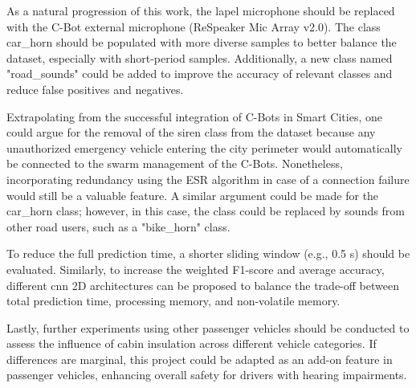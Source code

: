 As a natural progression of this work, the lapel microphone should be replaced with the C-Bot external microphone (ReSpeaker Mic Array v2.0). The class car\_horn should be populated with more diverse samples to better balance the dataset, especially with short-period samples. Additionally, a new class named "road\_sounds" could be added to improve the accuracy of relevant classes and reduce false positives and negatives. 

Extrapolating from the successful integration of C-Bots in Smart Cities, one could argue for the removal of the siren class from the dataset because any unauthorized emergency vehicle entering the city perimeter would automatically be connected to the swarm management of the C-Bots. Nonetheless, incorporating redundancy using the ESR algorithm in case of a connection failure would still be a valuable feature. A similar argument could be made for the car\_horn class; however, in this case, the class could be replaced by sounds from other road users, such as a "bike\_horn" class.

To reduce the full prediction time, a shorter sliding window (e.g., 0.5 \gls{s}) should be evaluated. Similarly, to increase the weighted F1-score and average accuracy, different \gls{cnn} 2D architectures can be proposed to balance the trade-off between total prediction time, processing memory, and non-volatile memory.

Lastly, further experiments using other passenger vehicles should be conducted to assess the influence of cabin insulation across different vehicle categories. If differences are marginal, this project could be adapted as an add-on feature in passenger vehicles, enhancing overall safety for drivers with hearing impairments.